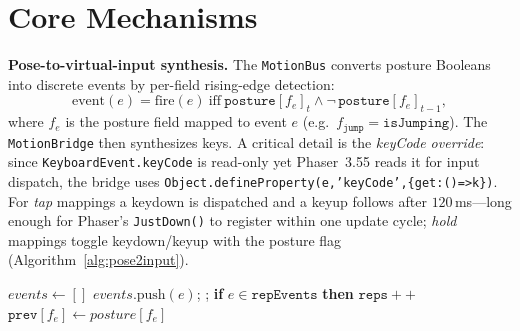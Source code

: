 \documentclass[runningheads]{llncs}
\newcommand{\motionbus}{\texttt{MotionBus}}
\newcommand{\motionbridge}{\texttt{MotionBridge}}
\begin{document}
\section{Core Mechanisms}\label{sec:mech}
\textbf{Pose-to-virtual-input synthesis.} The \motionbus{} converts posture Booleans
into discrete events by per-field rising-edge detection:
\begin{equation}
  \text{event}(e)=\text{fire}(e)\ \text{iff}\ \texttt{posture}[f_e]_{t}\land\lnot\,\texttt{posture}[f_e]_{t-1},
  \label{eq:edge}
\end{equation}
where $f_e$ is the posture field mapped to event $e$ (e.g.\ $f_{\texttt{jump}}=\texttt{isJumping}$).
The \motionbridge{} then synthesizes keys. A critical detail is the \emph{keyCode
override}: since \texttt{KeyboardEvent.keyCode} is read-only yet Phaser~3.55 reads it
for input dispatch, the bridge uses \texttt{Object.defineProperty(e,'keyCode',\{get:()=>k\})}.
For \emph{tap} mappings a keydown is dispatched and a keyup follows after
$120$\,ms---long enough for Phaser's \texttt{JustDown()} to register within one update
cycle; \emph{hold} mappings toggle keydown/keyup with the posture flag
(Algorithm~\ref{alg:pose2input}).

\begin{algorithm}[htbp]
\caption{Pose-to-virtual-input synthesis}\label{alg:pose2input}
\begin{algorithmic}[1]
 
  \State $\mathit{events}\gets[]$
      \State $\mathit{events}.\text{push}(e)$; ; \textbf{if} $e\in\texttt{repEvents}$ \textbf{then} $\texttt{reps}{+}{+}$
    \EndIf
    \State $\texttt{prev}[f_e]\gets\mathit{posture}[f_e]$
  \EndFor
  \State {}
\EndProcedure
{} 
       \EndIf
  \EndFor
    \State {}
  \EndFor
\EndProcedure
\end{algorithmic}
\end{algorithm}
\end{document}
